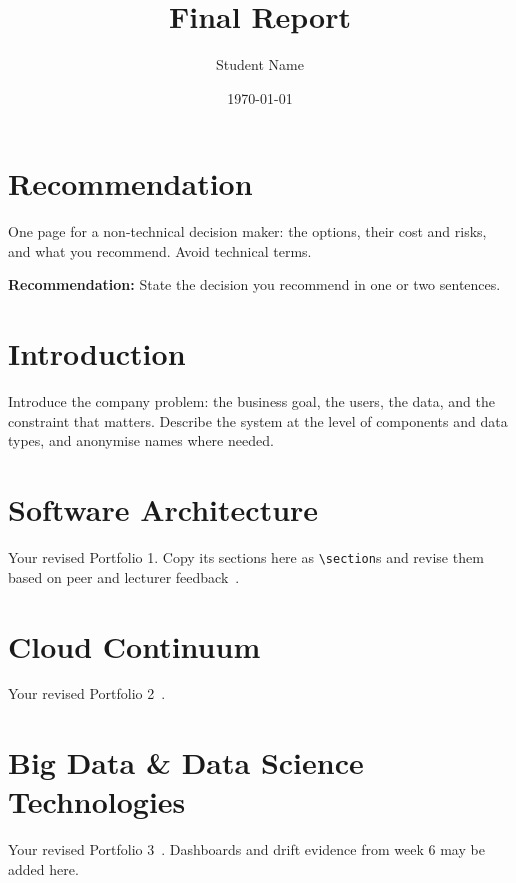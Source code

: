 \documentclass[report]{itvest}
\title{Final Report}
\author{Student Name} %
\date{\today}
\begin{document}
\maketitle

\tableofcontents

\chapter{Recommendation}

One page for a non-technical decision maker: the options, their cost and
risks, and what you recommend. Avoid technical terms.

\begin{checkit}
  \textbf{Recommendation:} State the decision you recommend in one or two
  sentences.
\end{checkit}

\chapter{Introduction}

Introduce the company problem: the business goal, the users, the data, and
the constraint that matters. Describe the system at the level of
components and data types, and anonymise names where needed.

\chapter{Software Architecture}

Your revised Portfolio 1. Copy its sections here as \verb|\section|s and
revise them based on peer and lecturer feedback~\cite{bass_software_2021}.

\chapter{Cloud Continuum}

Your revised Portfolio 2~\cite{bass_engineering_2025}.

\chapter{Big Data \& Data Science Technologies}

Your revised Portfolio 3~\cite{huyen_designing_2022}. Dashboards and
drift evidence from week 6 may be added here.
\end{document}
